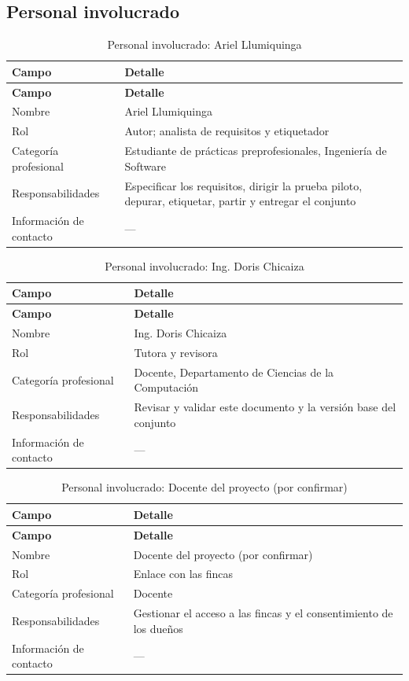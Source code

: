 \documentclass[11pt]{article}
\begin{document}
\subsection{Personal involucrado}
{\small
\begin{longtable}{|>{\RaggedRight\arraybackslash}p{3.91cm}|>{\RaggedRight\arraybackslash}p{10.95cm}|}
\caption{Personal involucrado: Ariel Llumiquinga}\\
\hline
\rowcolor{encabezado}\textbf{Campo} & \textbf{Detalle} \\ \hline
\endfirsthead
\hline
\rowcolor{encabezado}\textbf{Campo} & \textbf{Detalle} \\ \hline
\endhead
Nombre & Ariel Llumiquinga \\ \hline
Rol & Autor; analista de requisitos y etiquetador \\ \hline
Categoría profesional & Estudiante de prácticas preprofesionales, Ingeniería de Software \\ \hline
Responsabilidades & Especificar los requisitos, dirigir la prueba piloto, depurar, etiquetar, partir y entregar el conjunto \\ \hline
Información de contacto & — \\ \hline
\end{longtable}}
{\small
\begin{longtable}{|>{\RaggedRight\arraybackslash}p{3.91cm}|>{\RaggedRight\arraybackslash}p{10.95cm}|}
\caption{Personal involucrado: Ing. Doris Chicaiza}\\
\hline
\rowcolor{encabezado}\textbf{Campo} & \textbf{Detalle} \\ \hline
\endfirsthead
\hline
\rowcolor{encabezado}\textbf{Campo} & \textbf{Detalle} \\ \hline
\endhead
Nombre & Ing. Doris Chicaiza \\ \hline
Rol & Tutora y revisora \\ \hline
Categoría profesional & Docente, Departamento de Ciencias de la Computación \\ \hline
Responsabilidades & Revisar y validar este documento y la versión base del conjunto \\ \hline
Información de contacto & — \\ \hline
\end{longtable}}
{\small
\begin{longtable}{|>{\RaggedRight\arraybackslash}p{3.91cm}|>{\RaggedRight\arraybackslash}p{10.95cm}|}
\caption{Personal involucrado: Docente del proyecto (por confirmar)}\\
\hline
\rowcolor{encabezado}\textbf{Campo} & \textbf{Detalle} \\ \hline
\endfirsthead
\hline
\rowcolor{encabezado}\textbf{Campo} & \textbf{Detalle} \\ \hline
\endhead
Nombre & Docente del proyecto (por confirmar) \\ \hline
Rol & Enlace con las fincas \\ \hline
Categoría profesional & Docente \\ \hline
Responsabilidades & Gestionar el acceso a las fincas y el consentimiento de los dueños \\ \hline
Información de contacto & — \\ \hline
\end{longtable}}
\end{document}
